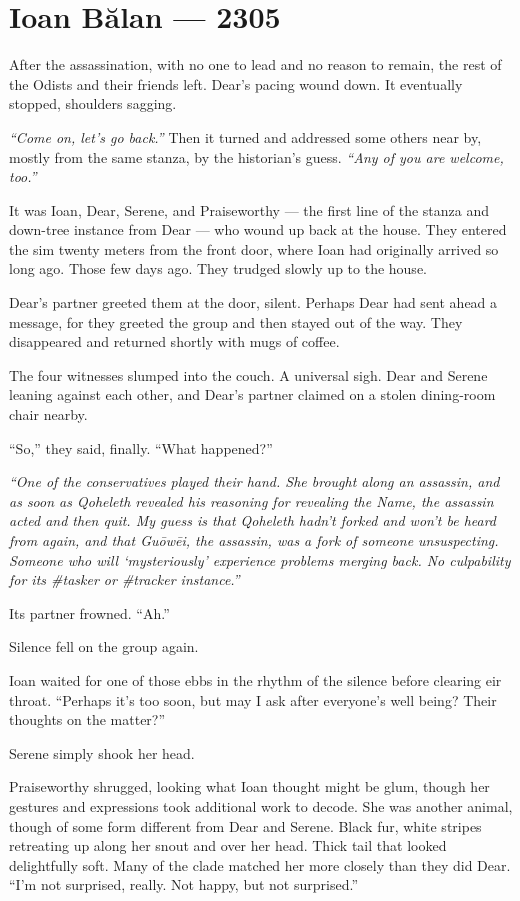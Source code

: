 \hypertarget{ioan-bux103lan-2305}{%
\chapter*{Ioan Bălan — 2305}\label{ioan-bux103lan-2305}}

After the assassination, with no one to lead and no reason to remain, the rest of the Odists and their friends left. Dear's pacing wound down. It eventually stopped, shoulders sagging.

\emph{``Come on, let's go back.''} Then it turned and addressed some others near by, mostly from the same stanza, by the historian's guess. \emph{``Any of you are welcome, too.''}

It was Ioan, Dear, Serene, and Praiseworthy — the first line of the stanza and down-tree instance from Dear — who wound up back at the house. They entered the sim twenty meters from the front door, where Ioan had originally arrived so long ago. Those few days ago. They trudged slowly up to the house.

Dear's partner greeted them at the door, silent. Perhaps Dear had sent ahead a message, for they greeted the group and then stayed out of the way. They disappeared and returned shortly with mugs of coffee.

The four witnesses slumped into the couch. A universal sigh. Dear and Serene leaning against each other, and Dear's partner claimed on a stolen dining-room chair nearby.

``So,'' they said, finally. ``What happened?''

\emph{``One of the conservatives played their hand. She brought along an assassin, and as soon as Qoheleth revealed his reasoning for revealing the Name, the assassin acted and then quit. My guess is that Qoheleth hadn't forked and won't be heard from again, and that Guōwēi, the assassin, was a fork of someone unsuspecting. Someone who will `mysteriously' experience problems merging back. No culpability for its \#tasker or \#tracker instance.''}

Its partner frowned. ``Ah.''

Silence fell on the group again.

Ioan waited for one of those ebbs in the rhythm of the silence before clearing eir throat. ``Perhaps it's too soon, but may I ask after everyone's well being? Their thoughts on the matter?''

Serene simply shook her head.

Praiseworthy shrugged, looking what Ioan thought might be glum, though her gestures and expressions took additional work to decode. She was another animal, though of some form different from Dear and Serene. Black fur, white stripes retreating up along her snout and over her head. Thick tail that looked delightfully soft. Many of the clade matched her more closely than they did Dear. ``I'm not surprised, really. Not happy, but not surprised.''

